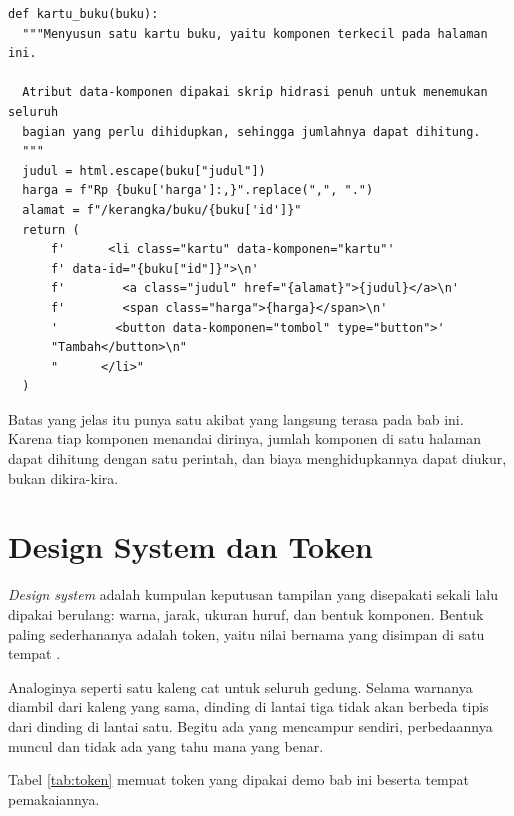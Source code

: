 \begin{lstlisting}[style=PythonStyle, caption={Komponen terkecil menerima satu buku dan mengembalikan HTML, tersedia di \berkas{sources/chapter11/komponen.py}}, label={lst:komponen11}]
def kartu_buku(buku):
  """Menyusun satu kartu buku, yaitu komponen terkecil pada halaman ini.

  Atribut data-komponen dipakai skrip hidrasi penuh untuk menemukan seluruh
  bagian yang perlu dihidupkan, sehingga jumlahnya dapat dihitung.
  """
  judul = html.escape(buku["judul"])
  harga = f"Rp {buku['harga']:,}".replace(",", ".")
  alamat = f"/kerangka/buku/{buku['id']}"
  return (
      f'      <li class="kartu" data-komponen="kartu"'
      f' data-id="{buku["id"]}">\n'
      f'        <a class="judul" href="{alamat}">{judul}</a>\n'
      f'        <span class="harga">{harga}</span>\n'
      '        <button data-komponen="tombol" type="button">'
      "Tambah</button>\n"
      "      </li>"
  )
\end{lstlisting}

Batas yang jelas itu punya satu akibat yang langsung terasa pada bab ini.
Karena tiap komponen menandai dirinya, jumlah komponen di satu halaman dapat
dihitung dengan satu perintah, dan biaya menghidupkannya dapat diukur, bukan
dikira-kira.

\section{Design System dan Token}

\textit{Design system} adalah kumpulan keputusan tampilan yang disepakati
sekali lalu dipakai berulang: warna, jarak, ukuran huruf, dan bentuk
komponen. Bentuk paling sederhananya adalah token, yaitu nilai bernama yang
disimpan di satu tempat \cite{dtcg-format}.

Analoginya seperti satu kaleng cat untuk seluruh gedung. Selama warnanya
diambil dari kaleng yang sama, dinding di lantai tiga tidak akan berbeda tipis
dari dinding di lantai satu. Begitu ada yang mencampur sendiri, perbedaannya
muncul dan tidak ada yang tahu mana yang benar.

Tabel \ref{tab:token} memuat token yang dipakai demo bab ini beserta tempat
pemakaiannya.

